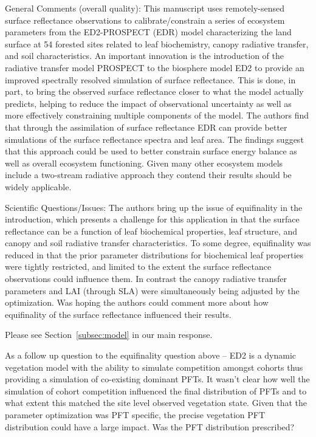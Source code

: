 \begin{reviewer}
  General Comments (overall quality): This manuscript uses remotely-sensed surface reflectance observations to calibrate/constrain a series of ecosystem parameters from the ED2-PROSPECT (EDR) model characterizing the land surface at 54 forested sites related to leaf biochemistry, canopy radiative transfer, and soil characteristics. An important innovation is the introduction of the radiative transfer model PROSPECT to the biosphere model ED2 to provide an improved spectrally resolved simulation of surface reflectance. This is done, in part, to bring the observed surface reflectance closer to what the model actually predicts, helping to reduce the impact of observational uncertainty as well as more effectively constraining multiple components of the model. The authors find that through the assimilation of surface reflectance EDR can provide better simulations of the surface reflectance spectra and leaf area. The findings suggest that this approach could be used to better constrain surface energy balance as well as overall ecosystem functioning. Given many other ecosystem models include a two-stream radiative approach they contend their results should be widely applicable.

  Scientific Questions/Issues: The authors bring up the issue of equifinality in the introduction, which presents a challenge for this application in that the surface reflectance can be a function of leaf biochemical properties, leaf structure, and canopy and soil radiative transfer characteristics. To some degree, equifinality was reduced in that the prior parameter distributions for biochemical leaf properties were tightly restricted, and limited to the extent the surface reflectance observations could influence them. In contrast the canopy radiative transfer parameters and LAI (through SLA) were simultaneously being adjusted by the optimization. Was hoping the authors could comment more about how equifinality of the surface reflectance influenced their results.
\end{reviewer}

Please see Section~\ref{subsec:model} in our main response.

\begin{reviewer}
  As a follow up question to the equifinality question above – ED2 is a dynamic vegetation model with the ability to simulate competition amongst cohorts thus providing a simulation of co-existing dominant PFTs.
  It wasn’t clear how well the simulation of cohort competition influenced the final distribution of PFTs and to what extent this matched the site level observed vegetation state.
  Given that the parameter optimization was PFT specific, the precise vegetation PFT distribution could have a large impact. Was the PFT distribution prescribed?
\end{reviewer}

